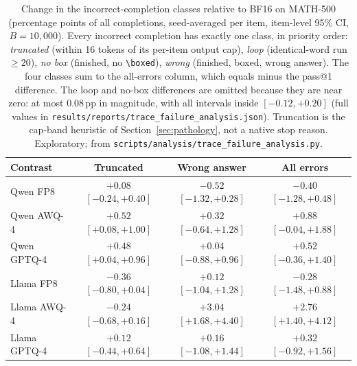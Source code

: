 \documentclass[11pt,a4paper]{article}
\begin{document}
\begin{table}[t]
\centering
\caption{Change in the incorrect-completion classes relative to BF16 on MATH-500 (percentage points of all completions, seed-averaged per item, item-level 95\% CI, $B=10{,}000$). Every incorrect completion has exactly one class, in priority order: \emph{truncated} (within 16 tokens of its per-item output cap), \emph{loop} (identical-word run $\ge 20$), \emph{no box} (finished, no \texttt{\textbackslash boxed}), \emph{wrong} (finished, boxed, wrong answer). The four classes sum to the all-errors column, which equals minus the pass@1 difference. The loop and no-box differences are omitted because they are near zero: at most 0.08\,pp in magnitude, with all intervals inside $[-0.12,+0.20]$ (full values in \texttt{results/reports/trace\_failure\_analysis.json}). Truncation is the cap-band heuristic of Section~\ref{sec:pathology}, not a native stop reason. Exploratory; from \texttt{scripts/analysis/trace\_failure\_analysis.py}.}
\label{tab:failure}
\small
\begin{tabular}{lccc}
\toprule
\textbf{Contrast} & \textbf{Truncated} & \textbf{Wrong answer} & \textbf{All errors} \\
\midrule
Qwen FP8 & $+0.08$ $[-0.24,+0.40]$ & $-0.52$ $[-1.32,+0.28]$ & $-0.40$ $[-1.28,+0.48]$ \\
Qwen AWQ-4 & $+0.52$ $[+0.08,+1.00]$ & $+0.32$ $[-0.64,+1.28]$ & $+0.88$ $[-0.04,+1.88]$ \\
Qwen GPTQ-4 & $+0.48$ $[+0.04,+0.96]$ & $+0.04$ $[-0.88,+0.96]$ & $+0.52$ $[-0.36,+1.40]$ \\
\midrule
Llama FP8 & $-0.36$ $[-0.80,+0.04]$ & $+0.12$ $[-1.04,+1.28]$ & $-0.28$ $[-1.48,+0.88]$ \\
Llama AWQ-4 & $-0.24$ $[-0.68,+0.16]$ & $+3.04$ $[+1.68,+4.40]$ & $+2.76$ $[+1.40,+4.12]$ \\
Llama GPTQ-4 & $+0.12$ $[-0.44,+0.64]$ & $+0.16$ $[-1.08,+1.44]$ & $+0.32$ $[-0.92,+1.56]$ \\
\bottomrule
\end{tabular}
\end{table}
\end{document}
